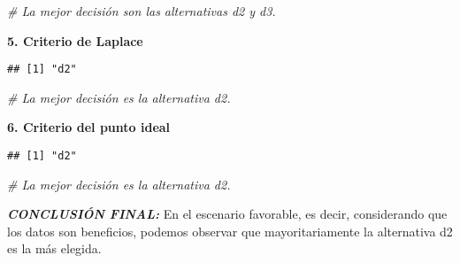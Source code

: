 \documentclass[
]{article}
\newenvironment{Shaded}{\begin{snugshade}}{\end{snugshade}}
\newcommand{\CommentTok}[1]{\textcolor[rgb]{0.56,0.35,0.01}{\textit{#1}}}
\newcommand{\FunctionTok}[1]{\textcolor[rgb]{0.13,0.29,0.53}{\textbf{#1}}}
\newcommand{\NormalTok}[1]{#1}
\newcommand{\OtherTok}[1]{\textcolor[rgb]{0.56,0.35,0.01}{#1}}
\newcommand{\SpecialCharTok}[1]{\textcolor[rgb]{0.81,0.36,0.00}{\textbf{#1}}}
\begin{document}
\begin{Shaded}
\begin{Highlighting}[]
\CommentTok{\# La mejor decisión son las alternativas d2 y d3.}
\end{Highlighting}
\end{Shaded}

\textbf{5. Criterio de Laplace}

\begin{Shaded}
\end{Shaded}

\begin{verbatim}
## [1] "d2"
\end{verbatim}

\begin{Shaded}
\begin{Highlighting}[]
\CommentTok{\# La mejor decisión es la alternativa d2.}
\end{Highlighting}
\end{Shaded}

\textbf{6. Criterio del punto ideal}

\begin{Shaded}
\end{Shaded}

\begin{verbatim}
## [1] "d2"
\end{verbatim}

\begin{Shaded}
\begin{Highlighting}[]
\CommentTok{\# La mejor decisión es la alternativa d2.}
\end{Highlighting}
\end{Shaded}

\textbf{\emph{CONCLUSIÓN FINAL:}} En el escenario favorable, es decir,
considerando que los datos son beneficios, podemos observar que
mayoritariamente la alternativa d2 es la más elegida.
\end{document}
